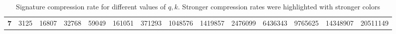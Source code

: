 \begin{table}[ht]
\begin{tabular}{|r|lllllllllllll}
\textbf{7}                                        & \cellcolor[HTML]{F3BEB9}3125    & \cellcolor[HTML]{F3BEB9}16807   & \cellcolor[HTML]{F3BEB9}32768   & \cellcolor[HTML]{F3BEB9}59049   & \cellcolor[HTML]{F3BEB9}161051   & \cellcolor[HTML]{F3BDB8}371293   & \cellcolor[HTML]{F3BBB6}1048576  & \cellcolor[HTML]{F3BAB5}1419857  & \cellcolor[HTML]{F2B7B1}2476099  & \cellcolor[HTML]{EFAAA4}6436343  & \cellcolor[HTML]{ED9F98}9765625  & \cellcolor[HTML]{EA9089}14348907 & \cellcolor[HTML]{E67C73}20511149 \\ \cline{1-1}
\end{tabular}
    \caption{Signature compression rate for different values of $q, k$. Stronger compression rates were highlighted with stronger colors}
    \label{table:signature-compression-cff-q-k}
\end{table}